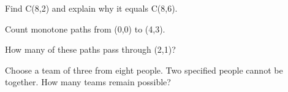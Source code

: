 \documentclass[11pt]{article}
\begin{document}
Find C(8,2) and explain why it equals C(8,6).\par
\vspace{5pt}
Count monotone paths from (0,0) to (4,3).\par
\vspace{5pt}
How many of these paths pass through (2,1)?\par
\vspace{5pt}
Choose a team of three from eight people. Two specified people cannot be together. How many teams remain possible?\par
\vspace{5pt}
\end{document}
